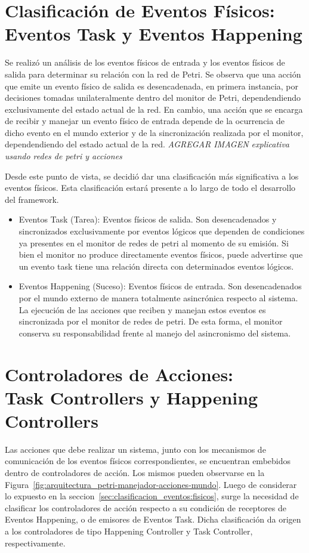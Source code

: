 \section{Clasificación de Eventos Físicos: \\Eventos Task y Eventos Happening}
\label{sec:clasificacion_eventos_fisicos} 
Se realizó un análisis de los eventos físicos de entrada y los eventos
físicos de salida para determinar su relación con la red de Petri. Se
observa que una acción que emite un evento físico de salida es desencadenada,
en primera instancia, por decisiones tomadas unilateralmente dentro del monitor
de Petri, dependendiendo exclusivamente del estado actual de la red. En cambio,
una acción que se encarga de recibir y manejar un evento físico de entrada depende de la
ocurrencia de dicho evento en el mundo exterior y de la sincronización
realizada por el monitor, dependendiendo del estado actual de la red.
\emph{\color{red} AGREGAR IMAGEN explicativa usando redes de petri y acciones}

Desde este punto de vista, se decidió dar una clasificación más significativa a
los eventos físicos. Esta clasificación estará presente a lo largo de todo
el desarrollo del framework.
\begin{itemize}
  \item Eventos Task (Tarea): Eventos físicos de salida. Son
  desencadenados y sincronizados exclusivamente por eventos lógicos que dependen
  de condiciones ya presentes en el monitor de redes de petri al momento de su
  emisión. Si bien el monitor no produce directamente eventos físicos, puede
  advertirse que un evento task tiene una relación directa con determinados
  eventos lógicos.
  \item Eventos Happening (Suceso): Eventos físicos de entrada. Son
  desencadenados por el mundo externo de manera totalmente asincrónica respecto
  al sistema. La ejecución de las acciones que reciben y manejan estos eventos
  es sincronizada por el monitor de redes de petri. De esta forma, el monitor
  conserva su responsabilidad frente al manejo del asincronismo del sistema.
\end{itemize}

\section{Controladores de Acciones: \\Task Controllers y Happening Controllers}
Las acciones que debe realizar un sistema, junto con los mecanismos de
comunicación de los eventos físicos correspondientes, se encuentran embebidos
dentro de controladores de acción. Los mismos pueden observarse en la
Figura~\ref{fig:arquitectura_petri-manejador-acciones-mundo}. 
Luego de considerar lo expuesto en la
seccion~\ref{sec:clasificacion_eventos:fisicos}, surge la necesidad de
clasificar los controladores de acción respecto a su condición de receptores de
Eventos Happening, o de emisores de Eventos Task. Dicha clasificación
da origen a los controladores de tipo Happening Controller y Task
Controller, respectivamente.

